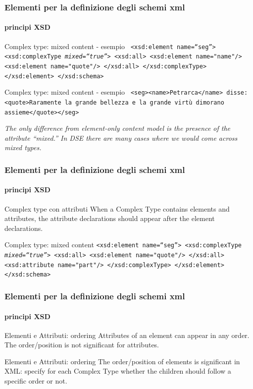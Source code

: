 \begin{frame}
	\frametitle{Elementi per la definizione degli schemi xml}
	\framesubtitle{principi XSD}
	\addtocounter{nframe}{1}

	\begin{block}{Complex type: mixed content - esempio}
		\texttt{
			<xsd:element name=``seg''>
			<xsd:complexType \textit{mixed=``true''}>
			<xsd:all>
			<xsd:element name="name"/>
			<xsd:element name="quote"/>
			</xsd:all>
			</xsd:complexType>
			</xsd:element>
			</xsd:schema>
		}
	\end{block}

	\begin{block}{Complex type: mixed content - esempio}
		\texttt{
			<seg><name>Petrarca</name> disse: <quote>Raramente la grande bellezza e la grande virtù dimorano assieme</quote></seg>
		}
	\end{block}

	\textit{The only difference from element-only content model is the presence of the attribute ``mixed.'' In DSE there are many cases where we would come across mixed types.}
\end{frame}

\begin{frame}
	\frametitle{Elementi per la definizione degli schemi xml}
	\framesubtitle{principi XSD}
	\addtocounter{nframe}{1}

	\begin{block}{Complex type con attributi}
		When a Complex Type contains elements and attributes, the attribute declarations should appear after the element declarations.
	\end{block}

	\begin{block}{Complex type: mixed content}
		\texttt{<xsd:element name=``seg''>
			<xsd:complexType \textit{mixed=``true''}>
			<xsd:all>
			<xsd:element name="quote"/>
			</xsd:all>
			<xsd:attribute name="part"/>
			</xsd:complexType>
			</xsd:element>
			</xsd:schema>}
	\end{block}
\end{frame}


\begin{frame}
	\frametitle{Elementi per la definizione degli schemi xml}
	\framesubtitle{principi XSD}
	\addtocounter{nframe}{1}

	\begin{block}{Elementi e Attributi: ordering}
		Attributes of an element can appear in any order. The order/position is not significant for attributes.

	\end{block}

	\begin{block}{Elementi e Attributi: ordering}
		The order/position of elements is significant in XML: specify for each Complex Type whether the children should follow a specific order or not.
	\end{block}
\end{frame}


